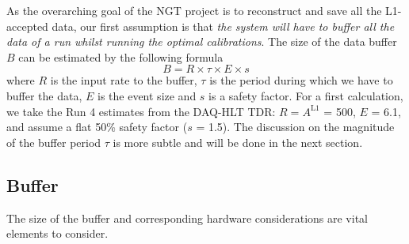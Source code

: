 As the overarching goal of the NGT project is to reconstruct and save all the L1-accepted data, 
our first assumption is that 
\emph{the system will have to buffer all the data of a run whilst running the optimal calibrations}.
The size of the data buffer $B$ can be estimated by the following formula
\begin{equation}
B = R \times \tau \times E \times s
\label{eq:buffersize}
\end{equation}
where $R$ is the input rate to the buffer,
$\tau$ is the period during which we have to buffer the data,
$E$ is the event size and
$s$ is a safety factor.
For a first calculation, we take the Run 4 estimates from the DAQ-HLT TDR:
$R = A^\text{L1}$ = 500\kHz, $E$ = 6.1\MB,
and assume a flat 50\% safety factor ($s$ = 1.5).
The discussion on the magnitude of the buffer period $\tau$ is more subtle and will be done in the next section.

\subsection{Buffer}\label{sec:DAQbuffer}

The size of the buffer and corresponding hardware considerations are vital elements to consider.

